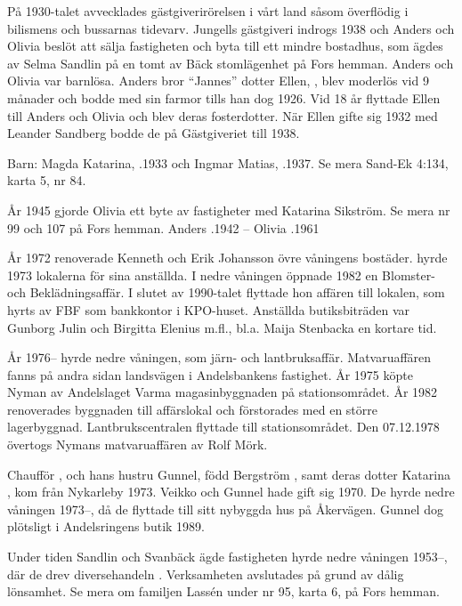 På 1930-talet avvecklades gästgiverirörelsen i vårt land såsom överflödig	i bilismens och bussarnas tidevarv. Jungells gästgiveri indrogs 1938 och	Anders och Olivia beslöt att sälja fastigheten och byta till ett mindre	bostadhus, som ägdes av Selma Sandlin på en tomt av Bäck stomlägenhet på Fors hemman. Anders och Olivia var barnlösa. Anders bror ``Jannes'' 	dotter Ellen, , blev moderlös vid 9 månader och bodde med sin farmor tills han dog 1926. Vid 18 år flyttade Ellen till Anders och	Olivia och blev deras fosterdotter. När Ellen gifte sig 1932 med Leander Sandberg bodde de på Gästgiveriet till 1938.

Barn:	Magda Katarina,	.1933 och Ingmar Matias,	.1937.	Se mera Sand-Ek 4:134, karta 5, nr 84.

År 1945 gjorde Olivia ett byte av fastigheter med Katarina Sikström. Se	mera nr 99 och 107 på Fors hemman.
Anders .1942  --  Olivia .1961


År 1972 renoverade Kenneth och Erik Johansson övre våningens bostäder.  hyrde 1973 lokalerna för sina anställda. I nedre våningen öppnade  1982 en Blomster- och	Beklädningsaffär. I slutet av 1990-talet flyttade hon affären till lokalen,	som hyrts av FBF som bankkontor i KPO-huset. Anställda butiksbiträden	var Gunborg Julin och Birgitta Elenius m.fl., bl.a. Maija Stenbacka en kortare tid.

År 1976-- hyrde  nedre våningen, som järn- och	lantbruksaffär. Matvaruaffären fanns på andra sidan landsvägen i	Andelsbankens fastighet. År 1975 köpte Nyman av Andelslaget Varma magasinbyggnaden på stationsområdet. År 1982 renoverades byggnaden till affärslokal och förstorades med en större lagerbyggnad. 	Lantbrukscentralen flyttade till stationsområdet. Den 07.12.1978 	övertogs Nymans matvaruaffären av Rolf Mörk.

Chaufför ,  och hans hustru Gunnel, född Bergström , samt deras dotter Katarina , kom från Nykarleby 1973. Veikko och Gunnel hade gift sig 1970. De hyrde nedre 	våningen 1973--, då de flyttade till sitt nybyggda hus på Åkervägen. Gunnel dog plötsligt i Andelsringens butik 1989.

Under tiden Sandlin och Svanbäck ägde fastigheten hyrde  nedre våningen 1953--, där de drev diversehandeln	. Verksamheten avslutades på grund av dålig lönsamhet. Se mera om familjen Lassén under nr 95, karta 6, på Fors hemman.

